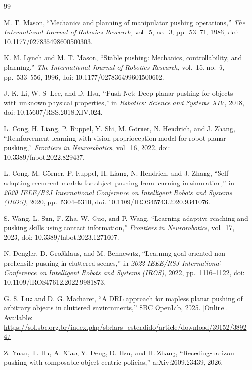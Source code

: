 \documentclass{misisarticle}
\begin{document}
\begin{thebibliography}{99}

 M. T. Mason, “Mechanics and planning of manipulator pushing operations,” \textit{The International Journal of Robotics Research}, vol.~5, no.~3, pp.~53--71, 1986, doi: 10.1177/027836498600500303.

 K. M. Lynch and M. T. Mason, “Stable pushing: Mechanics, controllability, and planning,” \textit{The International Journal of Robotics Research}, vol.~15, no.~6, pp.~533--556, 1996, doi: 10.1177/027836499601500602.

 J. K. Li, W. S. Lee, and D. Hsu, “Push-Net: Deep planar pushing for objects with unknown physical properties,” in \textit{Robotics: Science and Systems XIV}, 2018, doi: 10.15607/RSS.2018.XIV.024.

 L. Cong, H. Liang, P. Ruppel, Y. Shi, M. Görner, N. Hendrich, and J. Zhang, “Reinforcement learning with vision-proprioception model for robot planar pushing,” \textit{Frontiers in Neurorobotics}, vol.~16, 2022, doi: 10.3389/fnbot.2022.829437.

 L. Cong, M. Görner, P. Ruppel, H. Liang, N. Hendrich, and J. Zhang, “Self-adapting recurrent models for object pushing from learning in simulation,” in \textit{2020 IEEE/RSJ International Conference on Intelligent Robots and Systems (IROS)}, 2020, pp.~5304--5310, doi: 10.1109/IROS45743.2020.9341076.

 S. Wang, L. Sun, F. Zha, W. Guo, and P. Wang, “Learning adaptive reaching and pushing skills using contact information,” \textit{Frontiers in Neurorobotics}, vol.~17, 2023, doi: 10.3389/fnbot.2023.1271607.

 N. Dengler, D. Großklaus, and M. Bennewitz, “Learning goal-oriented non-prehensile pushing in cluttered scenes,” in \textit{2022 IEEE/RSJ International Conference on Intelligent Robots and Systems (IROS)}, 2022, pp.~1116--1122, doi: 10.1109/IROS47612.2022.9981873.

 G. S. Luz and D. G. Macharet, “A DRL approach for mapless planar pushing of arbitrary objects in cluttered environments,” SBC OpenLib, 2025. [Online]. Available: \url{https://sol.sbc.org.br/index.php/sbrlars_estendido/article/download/39152/38924/}

 Z. Yuan, T. Hu, A. Xiao, Y. Deng, D. Hsu, and H. Zhang, “Receding-horizon pushing with composable object-centric policies,” arXiv:2609.23439, 2026.


\end{thebibliography}
\end{document}
